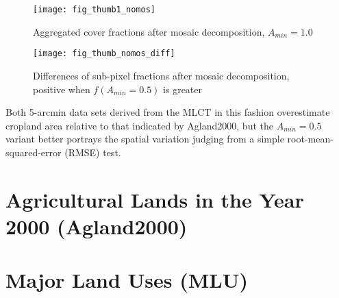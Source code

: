\begin{figure} 
\begin{center}
  


\texttt{[image: fig\_thumb1\_nomos]}
\end{center} 
\caption{Aggregated cover fractions after mosaic decomposition, $A_{min}=1.0$}
\label{fig:thumb1_nomos}
\end{figure} 

\begin{figure} 
\begin{center}
  

\texttt{[image: fig\_thumb\_nomos\_diff]}
\end{center} 
\caption{Differences of sub-pixel fractions after mosaic
  decomposition, positive when $f(A_{min} = 0.5)$ is greater}
\label{fig:thumb_diff}
\end{figure} 





Both 5-arcmin data sets derived from the MLCT in this fashion
overestimate cropland area relative to that indicated by Agland2000,
but the $A_{min} = 0.5$ variant better portrays the spatial variation
judging from a simple root-mean-squared-error (RMSE)
test. 

\section{Agricultural Lands in the Year 2000 (Agland2000)}
\label{sec:agland2000}

\citet{Ramankutty2008}

  

  

\section{Major Land Uses (MLU)}
\label{sec:mlu}


